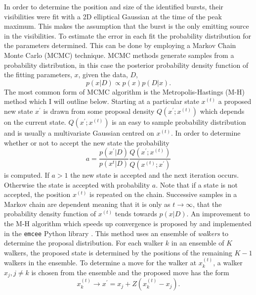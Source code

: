In order to determine the position and size of the identified bursts, their visibilities were fit with a 2D elliptical Gaussian at the time of the peak maximum. This makes the assumption that the burst is the only emitting source in the visibilities.
To estimate the error in each fit the probability distribution for the parameters determined. This can be done by employing a Markov Chain Monte Carlo (MCMC) technique. MCMC methods generate samples from a probability distribution, in this case the posterior probability density function of the fitting parameters, $x$, given the data, $D$,
\begin{equation}
\label{eq:pdf}
p(x \vert D) \propto p(x)p(D \vert x).
\end{equation}	
The most common form of MCMC algorithm is the Metropolis-Hastings (M-H) method which I will outline below. Starting at a particular state $x^{(t)}$ a proposed new state $x^\prime$ is drawn from some proposal density $Q(x^\prime;x^{(t)})$ which depends on the current state. $Q(x^\prime;x^{(t)})$ is an easy to sample probability distribution and is usually a multivariate Gaussian centred on $x^{(t)}$. In order to determine whether or not to accept the new state the probability
\begin{equation}
\label{eq:MHnewstate}
a = \frac{p(x^\prime \vert D)}{p(x^{t} \vert D)} \frac{Q(x^\prime;x^{(t)})}{Q(x^{(t)};x^\prime)}
\end{equation}
is computed. If $a > 1$ the new state is accepted and the next iteration occurs. Otherwise the state is accepted with probability $a$. Note that if a state is not accepted, the position $x^{(t)}$ is repeated on the chain. Successive samples in a Markov chain are dependent meaning that it is only as $t \rightarrow \infty$, that the probability density function of $x^{(t)}$ tends towards $p(x \vert D)$. An improvement to the M-H algorithm which speeds up convergence is proposed by \cite{Goodman2010} and implemented in the \texttt{emcee} Python library \citep{Foreman-Mackey2012}. This method uses an ensemble of \textit{walkers} to determine the proposal distribution. For each walker $k$ in an ensemble of $K$ walkers, the proposed state is determined by the positions of the remaining $K-1$ walkers in the ensemble. To determine a move for the walker at $x_k^{(t)}$, a walker $x_j, j \neq k$ is chosen from the ensemble and the proposed move has the form
\begin{equation}
\label{eq:MCMC_walkers}
x_k^{(t)} \rightarrow x^\prime = x_j + Z(x_k^{(t)} - x_j).
\end{equation}
